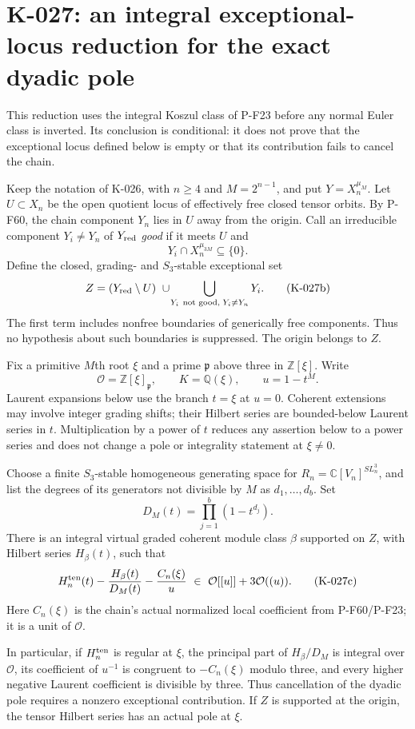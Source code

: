 \section{K-027: an integral exceptional-locus reduction for the exact dyadic pole}

This reduction uses the integral Koszul class of P-F23 before any
normal Euler class is inverted.  Its conclusion is conditional: it
does not prove that the exceptional locus defined below is empty or
that its contribution fails to cancel the chain.

Keep the notation of K-026, with $n\ge4$ and $M=2^{n-1}$, and put
$Y=X_n^{\mu_M}$.  Let $U\subset X_n$ be the open quotient locus of
effectively free closed tensor orbits.  By P-F60, the chain component
$Y_n$ lies in $U$ away from the origin.  Call an irreducible component
$Y_i\ne Y_n$ of $Y_{\rm red}$ \emph{good} if it meets $U$ and
\[
              Y_i\cap X_n^{\mu_{3M}}\subseteq\{0\}.
                                                        \tag{K-027a}
\]
Define the closed, grading- and $S_3$-stable exceptional set
\[
 Z=(Y_{\rm red}\setminus U)\ \cup\!
       \bigcup_{Y_i\ \text{not good},\;Y_i\ne Y_n}Y_i.
                                                        \tag{K-027b}
\]
The first term includes nonfree boundaries of generically free
components.  Thus no hypothesis about such boundaries is suppressed.
The origin belongs to $Z$.

Fix a primitive $M$th root $\xi$ and a prime $\mathfrak p$ above
three in $\mathbb Z[\xi]$.  Write
\[
 \mathcal O=\mathbb Z[\xi]_{\mathfrak p},\qquad
 K=\mathbb Q(\xi),\qquad u=1-t^M.
\]
Laurent expansions below use the branch $t=\xi$ at $u=0$.
Coherent extensions may involve integer grading shifts; their Hilbert
series are bounded-below Laurent series in $t$.  Multiplication by
a power of $t$ reduces any assertion below to a power series and
does not change a pole or integrality statement at $\xi\ne0$.

\begin{proposition}[K-027]
Choose a finite $S_3$-stable homogeneous generating space for
$R_n=\mathbb C[V_n]^{SL_n^3}$, and list the degrees of its generators
not divisible by $M$ as $d_1,\ldots,d_b$.  Set
\[
                         D_M(t)=\prod_{j=1}^b(1-t^{d_j}).
\]
There is an integral virtual graded coherent module class
$\beta$ supported on $Z$, with Hilbert series $H_\beta(t)$,
such that
\[
 H_n^{\rm ten}(t)
       -\frac{H_\beta(t)}{D_M(t)}
       -\frac{C_n(\xi)}{u}
             \ \in\ \mathcal O[[u]]+3\mathcal O((u)).
                                                        \tag{K-027c}
\]
Here $C_n(\xi)$ is the chain's actual normalized local coefficient
from P-F60/P-F23; it is a unit of $\mathcal O$.

In particular, if $H_n^{\rm ten}$ is regular at $\xi$, the principal
part of $H_\beta/D_M$ is integral over $\mathcal O$, its coefficient
of $u^{-1}$ is congruent to $-C_n(\xi)$ modulo three, and every
higher negative Laurent coefficient is divisible by three.
Thus cancellation of the dyadic pole requires a nonzero exceptional
contribution.  If $Z$ is supported at the origin, the tensor Hilbert
series has an actual pole at $\xi$.
\end{proposition}

